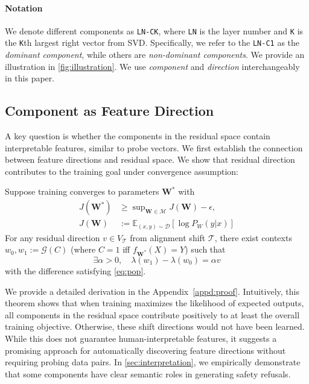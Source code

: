 \paragraph{Notation}
We denote different components as \texttt{LN-CK}, where \texttt{LN} is the layer number and \texttt{K} is the \texttt{K}th largest right vector from SVD. Specifically, we refer to the \texttt{LN-C1} as the \emph{dominant component}, while others are \emph{non-dominant components}. We provide an illustration in \autoref{fig:illustration}. We use \textit{component} and \textit{direction} interchangeably in this paper.

\subsection{Component as Feature Direction}

A key question is whether the components in the residual space contain interpretable features, similar to probe vectors. We first establish the connection between feature directions and residual space. We show that residual direction contributes to the training goal under convergence assumption:

\begin{theorem}
    \label{thm:convergence-utility}
    Suppose training converges to parameters $\mathbf{W}^*$ with
    \[
    \begin{aligned}
    J(\mathbf{W}^*) &\geq \sup\nolimits_{\mathbf{W}\in\mathcal{M}} J(\mathbf{W}) - \epsilon, \\
    J(\mathbf{W}) &:= \mathbb{E}_{(x,y)\sim\mathcal{D}}[\log P_W(y|x)]
    \end{aligned}
    \]
    For any residual direction $v \in V_{\mathcal{T}}$ from alignment shift $\mathcal{T}$, there exist contexts $w_0, w_1 := \mathcal{G}(C)$ (where $C=1$ iff $f_{\mathbf{W}^*}(X)=Y$) such that
    \[
    \exists \alpha>0,\quad \lambda(w_1) - \lambda(w_0) = \alpha v
    \]
    with the difference satisfying \autoref{eq:pop}.
    \end{theorem}
We provide a detailed derivation in the Appendix~\ref{appd:proof}. Intuitively, this theorem shows that when training maximizes the likelihood of expected outputs, all components in the residual space contribute positively to at least the overall training objective. Otherwise, these shift directions would not have been learned. While this does not guarantee human-interpretable features, it suggests a promising approach for automatically discovering feature directions without requiring probing data pairs. In \autoref{sec:interpretation}, we empirically demonstrate that some components have clear semantic roles in generating safety refusals.

